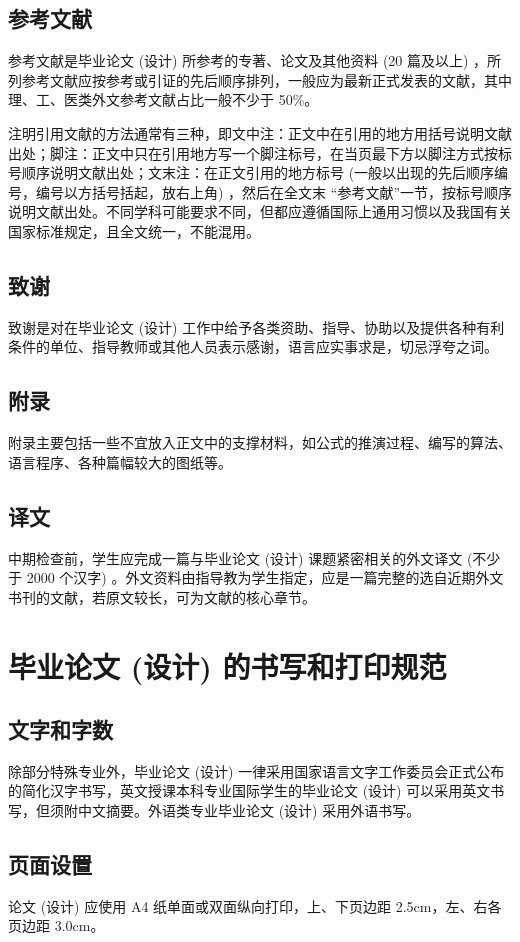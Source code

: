 \subsection{参考文献}
参考文献是毕业论文 (设计) 所参考的专著、论文及其他资料 (20 篇及以上) ，所列参考文献应按参考或引证的先后顺序排列，一般应为最新正式发表的文献，其中理、工、医类外文参考文献占比一般不少于 50\%。

注明引用文献的方法通常有三种，即文中注：正文中在引用的地方用括号说明文献出处；脚注：正文中只在引用地方写一个脚注标号，在当页最下方以脚注方式按标号顺序说明文献出处；文末注：在正文引用的地方标号 (一般以出现的先后顺序编号，编号以方括号括起，放右上角) ，然后在全文末 “参考文献”一节，按标号顺序说明文献出处。不同学科可能要求不同，但都应遵循国际上通用习惯以及我国有关国家标准规定，且全文统一，不能混用。
\subsection{致谢}
致谢是对在毕业论文 (设计) 工作中给予各类资助、指导、协助以及提供各种有利条件的单位、指导教师或其他人员表示感谢，语言应实事求是，切忌浮夸之词。
\subsection{附录}
附录主要包括一些不宜放入正文中的支撑材料，如公式的推演过程、编写的算法、语言程序、各种篇幅较大的图纸等。
\subsection{译文}
中期检查前，学生应完成一篇与毕业论文 (设计) 课题紧密相关的外文译文 (不少于 2000 个汉字) 。外文资料由指导教为学生指定，应是一篇完整的选自近期外文书刊的文献，若原文较长，可为文献的核心章节。
\section{毕业论文 (设计) 的书写和打印规范}
\subsection{文字和字数}
除部分特殊专业外，毕业论文 (设计) 一律采用国家语言文字工作委员会正式公布的简化汉字书写，英文授课本科专业国际学生的毕业论文 (设计) 可以采用英文书写，但须附中文摘要。外语类专业毕业论文 (设计) 采用外语书写。
\subsection{页面设置}
论文 (设计) 应使用 A4 纸单面或双面纵向打印，上、下页边距 2.5cm，左、右各页边距 3.0cm。

